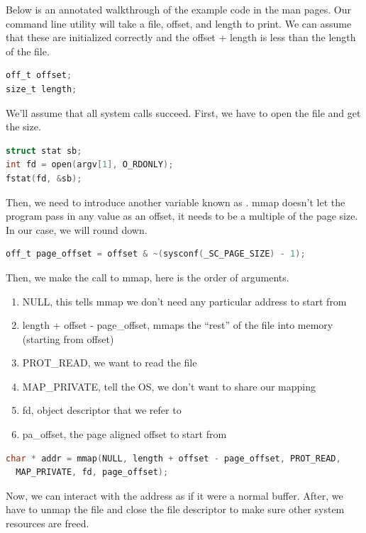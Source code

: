 Below is an annotated walkthrough of the example code in the man pages.
Our command line utility will take a file, offset, and length to print.
We can assume that these are initialized correctly and the offset + length is less than the length of the file.

\begin{lstlisting}[language=C]
off_t offset;
size_t length;
\end{lstlisting}

We'll assume that all system calls succeed.
First, we have to open the file and get the size.

\begin{lstlisting}[language=C]
struct stat sb;
int fd = open(argv[1], O_RDONLY);
fstat(fd, &sb);
\end{lstlisting}

Then, we need to introduce another variable known as .
mmap doesn't let the program pass in any value as an offset, it needs to be a multiple of the page size.
In our case, we will round down.

\begin{lstlisting}[language=C]
off_t page_offset = offset & ~(sysconf(_SC_PAGE_SIZE) - 1);
\end{lstlisting}

Then, we make the call to mmap, here is the order of arguments.
\begin{enumerate}
\item NULL, this tells mmap we don't need any particular address to start from
\item length + offset - page\_offset, mmaps the ``rest'' of the file into memory (starting from offset)
\item PROT\_READ, we want to read the file
\item MAP\_PRIVATE, tell the OS, we don't want to share our mapping
\item fd, object descriptor that we refer to
\item pa\_offset, the page aligned offset to start from
\end{enumerate}

\begin{lstlisting}[language=C]
char * addr = mmap(NULL, length + offset - page_offset, PROT_READ,
  MAP_PRIVATE, fd, page_offset);
\end{lstlisting}

Now, we can interact with the address as if it were a normal buffer.
After, we have to unmap the file and close the file descriptor to make sure other system resources are freed.

